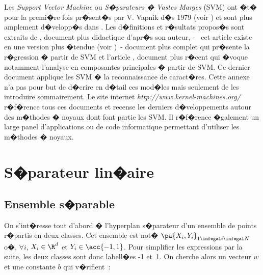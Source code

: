 
\firstpassagedo{}

\firstpassagedo{}



\label{annexe_svm}


Les \emph{Support Vector Machine} ou \emph{S�parateurs � Vastes Marges} (SVM) ont �t� pour la premi�re fois pr�sent�s par V. Vapnik d�s 1979 (voir ) et sont plus amplement d�velopp�s dans . Les d�finitions et r�sultats propos�s sont extraits de , document plus didactique d'apr�s son auteur,  -~ cet article existe en une version plus �tendue (voir )~- document plus complet qui pr�sente la r�gression � partir de SVM et l'article , document plus r�cent qui �voque notamment l'analyse en composantes principales � partir de SVM. Ce dernier document applique les SVM � la reconnaissance de caract�res. Cette annexe n'a pas pour but de d�crire en d�tail ces mod�les mais seulement de les introduire sommairement. Le site internet \textit{http://www.kernel-machines.org/} r�f�rence tous ces documents et recense les derniers d�veloppements autour des m�thodes � noyaux dont font partie les SVM. Il r�f�rence �galement un large panel d'applications ou de code informatique permettant d'utiliser les m�thodes � noyaux.



\section{S�parateur lin�aire}

\label{svm_separateur_lineaire}

\subsection{Ensemble s�parable}


On s'int�resse tout d'abord � l'hyperplan s�parateur d'un ensemble de points r�partis en deux classes. Cet ensemble est not� $\pa{X_i,Y_i}_{1 \infegal i \infegal N}$ o�, $\forall i$, $X_i \in \R^d$ et $Y_i \in \acc{-1,1}$. Pour simplifier les expressions par la suite, les deux classes sont donc labell�es -1 et~1. On cherche alors un vecteur $w$ et une constante $b$ qui v�rifient~:

